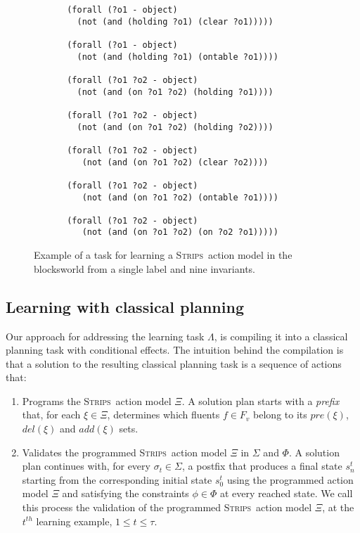 \documentclass{article}
\newcommand{\strips}{\textsc{Strips}}     %
\begin{document}
\begin{figure}
\begin{subfigure}{.6\textwidth}
\begin{scriptsize}
\begin{verbatim}
 (forall (?o1 - object)
   (not (and (holding ?o1) (clear ?o1)))))

 (forall (?o1 - object)
   (not (and (holding ?o1) (ontable ?o1))))

 (forall (?o1 ?o2 - object)
   (not (and (on ?o1 ?o2) (holding ?o1))))

 (forall (?o1 ?o2 - object)
   (not (and (on ?o1 ?o2) (holding ?o2))))

 (forall (?o1 ?o2 - object)
    (not (and (on ?o1 ?o2) (clear ?o2))))

 (forall (?o1 ?o2 - object)
    (not (and (on ?o1 ?o2) (ontable ?o1))))

 (forall (?o1 ?o2 - object)
    (not (and (on ?o1 ?o2) (on ?o2 ?o1)))))
\end{verbatim}
\end{scriptsize}
\end{subfigure}%
 \caption{\small Example of a task for learning a \strips\ action model in the blocksworld from a single label and nine invariants.}
\label{fig:lexample}
\end{figure}

\subsection{Learning with classical planning}

Our approach for addressing the learning task $\Lambda$, is compiling it into a classical planning task with conditional effects. The intuition behind the compilation is that a solution to the resulting classical planning task is a sequence of actions that:
\begin{enumerate}
\item Programs the \strips\ action model $\Xi$. A solution plan starts with a {\em prefix} that, for each $\xi\in\Xi$, determines which fluents $f\in F_v$ belong to its $pre(\xi)$, $del(\xi)$ and $add(\xi)$ sets.
\item Validates the programmed \strips\ action model $\Xi$ in $\Sigma$ and $\Phi$. A solution plan continues with, for every $\sigma_t\in \Sigma$, a postfix that produces a final state $s_{n}^t$ starting from the corresponding initial state $s_0^t$ using the programmed action model $\Xi$ and satisfying the constraints $\phi\in\Phi$ at every reached state. We call this process the validation of the programmed \strips\ action model $\Xi$, at the $t^{th}$ learning example, {\small $1\leq t\leq \tau$}. %
\end{enumerate}
\end{document}
